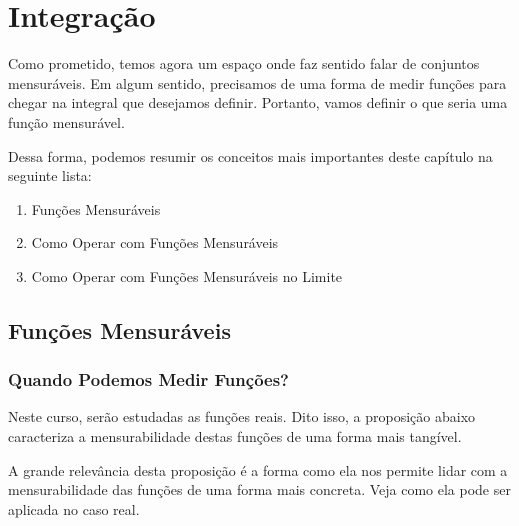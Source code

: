 \chapter{Integração}

Como prometido, temos agora um espaço onde faz sentido falar de conjuntos mensuráveis. Em algum sentido, precisamos de uma forma de medir funções para chegar na integral que desejamos definir. Portanto, vamos definir o que seria uma função mensurável.

Dessa forma, podemos resumir os conceitos mais importantes deste capítulo na seguinte lista:

\begin{enumerate}
    \item Funções Mensuráveis
    \item Como Operar com Funções Mensuráveis
    \item Como Operar com Funções Mensuráveis no Limite
\end{enumerate}















\section{Funções Mensuráveis}
\subsection*{Quando Podemos Medir Funções?}

\measurableFunctions

Neste curso, serão estudadas as funções reais. Dito isso, a proposição abaixo caracteriza a mensurabilidade destas funções de uma forma mais tangível.

\measurableFunctionsAndSigmaAlgebrasGeneratedBySet

A grande relevância desta proposição é a forma como ela nos permite lidar com a mensurabilidade das funções de uma forma mais concreta. Veja como ela pode ser aplicada no caso real.

\measurableFunctionsInR


